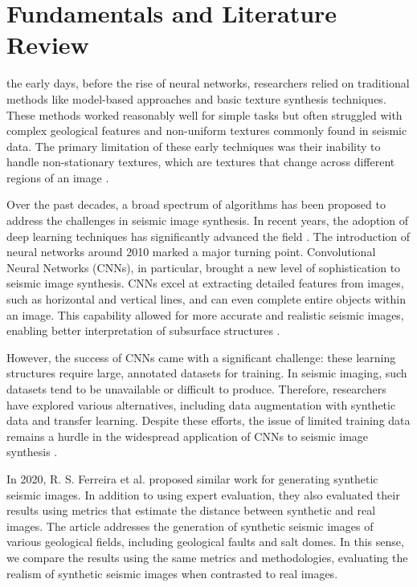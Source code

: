 \documentclass{ieeeaccess}
\begin{document}
\section{Fundamentals and Literature Review}

  the early days, before the rise of neural networks, researchers relied on traditional methods like model-based approaches and basic texture synthesis techniques. These methods worked reasonably well for simple tasks but often struggled with complex geological features and non-uniform textures commonly found in seismic data. The primary limitation of these early techniques was their inability to handle non-stationary textures, which are textures that change across different regions of an image \cite{ref16}.

 Over the past decades, a broad spectrum of algorithms has been proposed to address the challenges in seismic image synthesis. In recent years, the adoption of deep learning techniques has significantly advanced the field \cite{ref5}. The introduction of neural networks around 2010 marked a major turning point. Convolutional Neural Networks (CNNs), in particular, brought a new level of sophistication to seismic image synthesis. CNNs excel at extracting detailed features from images, such as horizontal and vertical lines, and can even complete entire objects within an image. This capability allowed for more accurate and realistic seismic images, enabling better interpretation of subsurface structures \cite{ref14}. 

However, the success of CNNs came with a significant challenge: these learning structures require large, annotated datasets for training. In seismic imaging, such datasets tend to be unavailable or difficult to produce. Therefore, researchers have explored various alternatives,  including data augmentation with synthetic data and transfer learning. Despite these efforts, the issue of limited training data remains a hurdle in the widespread application of CNNs to seismic image synthesis \cite{ref15}.

In 2020, R. S. Ferreira et al. \cite{ref19}  proposed similar work for generating synthetic seismic images. In addition to using expert evaluation, they also evaluated their results using metrics that estimate the distance between synthetic and real images. The article addresses the generation of synthetic seismic images of various geological fields, including geological faults and salt domes. In this sense, we compare the results using the same metrics and methodologies, evaluating the realism of synthetic seismic images when contrasted to real images.
\end{document}
